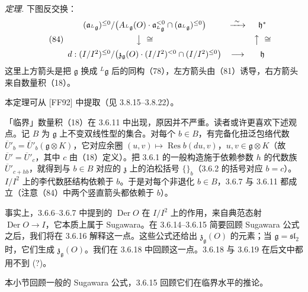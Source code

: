  \emph{定理.} 下图反交换：
\begin{equation}\tag{84}
\begin{array}{ccc}
(\mathfrak{a}_{{}^{L}\mathfrak{g}})^{\le 0}/\bigl(A_{{}^{L}\mathfrak{g}}(O)\cdot\mathfrak{a}_{{}^{L}\mathfrak{g}}^{<0} \cap (\mathfrak{a}_{{}^{L}\mathfrak{g}})^{\le 0}\bigr) & \xrightarrow{\ \sim\ } & \mathfrak{h}^{*}\\[2mm]
\big\downarrow\ \cong & & \big\uparrow\ \cong\\[2mm]
d: (I/I^{2})^{\le 0}/\bigl(\mathfrak{z}_{\mathfrak{g}}(O)\cdot(I/I^{2})^{<0} \cap (I/I^{2})^{\le 0}\bigr) & \longrightarrow & \mathfrak{h}
\end{array}
\end{equation}
这里上方箭头是把 $\mathfrak{g}$ 换成 ${}^{L}\mathfrak{g}$ 后的同构（78），左方箭头由（81）诱导，右方箭头来自数量积（18）。

本定理可从 [FF92] 中提取（见 3.8.15--3.8.22）。

 「临界」数量积（18）在 3.6.11 中出现，原因并不严重。读者或许更喜欢下述观点。记 $B$ 为 $\mathfrak{g}$ 上不变双线性型的集合。对每个 $b \in B$，有完备化扭泛包络代数 $\overline{U}'_{b} = \overline{U}'_{b}(\mathfrak{g}\otimes K)$，它对应余圈 $(u, v) \mapsto \operatorname{Res} b(du, v)$，$u, v \in \mathfrak{g}\otimes K$（故 $\overline{U}' = \overline{U}'_{c}$，其中 $c$ 由（18）定义）。把 3.6.1 的一般构造施于依赖参数 $h$ 的代数族 $\overline{U}'_{c+hb}$，就得到与 $b \in B$ 对应的 $\mathfrak{z}$ 上的泊松括号 $\{\}_{b}$（3.6.2 的括号对应 $b = c$）。$I/I^{2}$ 上的李代数胚结构依赖于 $b$。于是对每个非退化 $b \in B$，3.6.7 与 3.6.11 都成立（注意（84）中两个竖直箭头都依赖于 $b$）。


 事实上，3.6.6--3.6.7 中提到的 $\operatorname{Der} O$ 在 $I/I^{2}$ 上的作用，来自典范态射 $\operatorname{Der} O \to I$，它本质上属于 Sugawara。在 3.6.14--3.6.15 简要回顾 Sugawara 公式之后，我们将在 3.6.16 解释这一点。这些公式还给出 $\mathfrak{z}_{\mathfrak{g}}(O)$ 的元素；当 $\mathfrak{g} = \mathfrak{sl}_{2}$ 时，它们生成 $\mathfrak{z}_{\mathfrak{g}}(O)$。我们在 3.6.18 中回顾这一点。3.6.18 与 3.6.19 在后文中都用不到 (?)。

 本小节回顾一般的 Sugawara 公式，3.6.15 回顾它们在临界水平的推论。

